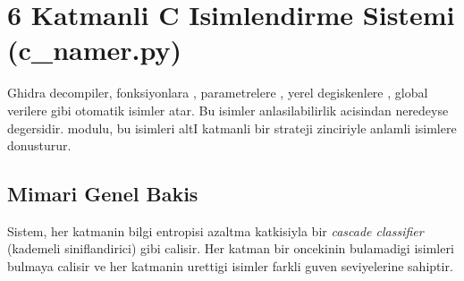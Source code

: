 \section{6 Katmanli C Isimlendirme Sistemi (c\_namer.py)}
\label{sec:c-namer}

Ghidra decompiler, fonksiyonlara , parametrelere
, yerel degiskenlere , global verilere
 gibi otomatik isimler atar. Bu isimler anlasilabilirlik
acisindan neredeyse degersidir.  modulu, bu isimleri
altI katmanli bir strateji zinciriyle anlamli isimlere donusturur.

\subsection{Mimari Genel Bakis}

Sistem, her katmanin bilgi entropisi azaltma katkisiyla bir \emph{cascade
classifier} (kademeli siniflandirici) gibi calisir. Her katman bir oncekinin
bulamadigi isimleri bulmaya calisir ve her katmanin urettigi isimler farkli
guven seviyelerine sahiptir.

